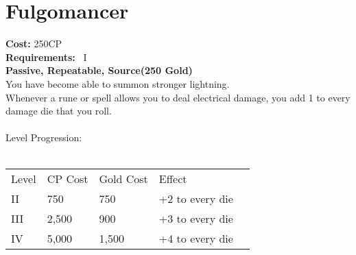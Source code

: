 \section{Fulgomancer}\label{perk:fulgomancer}
\textbf{Cost:} 250CP\\
\textbf{Requirements:}~ I\\
\textbf{Passive, Repeatable, Source(250 Gold)}\\
You have become able to summon stronger lightning.\\
Whenever a rune or spell allows you to deal electrical damage, you add 1 to every damage die that you roll.\\
\\
Level Progression:\\
\\
\begin{tabular}{l | l | l | l | l}
    Level & CP Cost & Gold Cost &  Effect\\
    II & 750 & 750 & +2 to every die\\
    III & 2,500 & 900 & +3 to every die\\
    IV & 5,000 & 1,500 & +4 to every die\\
\end{tabular}